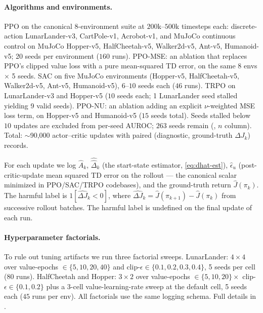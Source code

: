 \documentclass{article}
\begin{document}
\paragraph{Algorithms and environments.}
PPO \citep{schulman2017proximal} on the canonical 8-environment suite at $200$k--$500$k timesteps each: discrete-action LunarLander-v3, CartPole-v1, Acrobot-v1, and MuJoCo continuous control on MuJoCo \citep{todorov2012mujoco} Hopper-v5, HalfCheetah-v5, Walker2d-v5, Ant-v5, Humanoid-v5; 20 seeds per environment ($160$ runs). PPO-MSE: an ablation that replaces PPO's clipped value loss with a pure mean-squared TD error, on the same 8 envs $\times$ 5 seeds. SAC \citep{haarnoja2018soft} on five MuJoCo environments (Hopper-v5, HalfCheetah-v5, Walker2d-v5, Ant-v5, Humanoid-v5), $6$--$10$ seeds each ($46$ runs). TRPO \citep{schulman2015trust} on LunarLander-v3 and Hopper-v5 ($10$ seeds each; 1 LunarLander seed stalled yielding 9 valid seeds). PPO-NU: an ablation adding an explicit $\nu$-weighted MSE loss term, on Hopper-v5 and Humanoid-v5 ($15$ seeds total). Seeds stalled below $10$ updates are excluded from per-seed AUROC; $263$ seeds remain (, $n$ column). Total: $\sim$90{,}000 actor--critic updates with paired (diagnostic, ground-truth $\Delta J_k$) records.

For each update we log $\widehat{A}_k$, $\widehat{\hat\Delta}_k$ (the start-state estimator, \cref{eq:dhat-est}), $\widehat\epsilon_u$ (post-critic-update mean squared TD error on the rollout --- the canonical scalar minimized in PPO/SAC/TRPO codebases), and the ground-truth return $\widehat J(\pi_k)$. The harmful label is $1[\widehat{\Delta J}_k < 0]$, where $\widehat{\Delta J}_k = \widehat J(\pi_{k+1}) - \widehat J(\pi_k)$ from successive rollout batches. The harmful label is undefined on the final update of each run.

\paragraph{Hyperparameter factorials.}
To rule out tuning artifacts we run three factorial sweeps. LunarLander: $4\times 4$ over value-epochs $\in \{5, 10, 20, 40\}$ and clip-$\epsilon \in \{0.1, 0.2, 0.3, 0.4\}$, 5 seeds per cell ($80$ runs). HalfCheetah and Hopper: $3\times 2$ over value-epochs $\in \{5, 10, 20\} \times$ clip-$\epsilon \in \{0.1, 0.2\}$ plus a 3-cell value-learning-rate sweep at the default cell, 5 seeds each ($45$ runs per env). All factorials use the same logging schema. Full details in .
\end{document}
